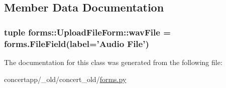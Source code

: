 \subsection{Member Data Documentation}
\hypertarget{classforms_1_1_upload_file_form_a35dd98408c224c9442b7ce31532ad09a}{
\subsubsection[{wavFile}]{\setlength{\rightskip}{0pt plus 5cm}tuple {\bf forms::UploadFileForm::wavFile} = forms.FileField(label='Audio File')}}
\label{classforms_1_1_upload_file_form_a35dd98408c224c9442b7ce31532ad09a}


The documentation for this class was generated from the following file:\begin{DoxyCompactItemize}
\item 
concertapp/\_\-old/concert\_\-old/\hyperlink{__old_2concert__old_2forms_8py}{forms.py}\end{DoxyCompactItemize}
